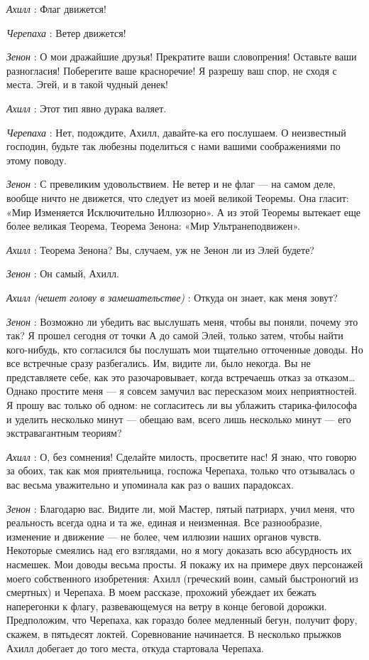 \emph{Ахилл} : Флаг движется!

\emph{Черепаха} : Ветер движется!

\emph{Зенон} : О мои дражайшие друзья! Прекратите ваши словопрения! Оставьте ваши разногласия! Поберегите ваше красноречие! Я разрешу ваш спор, не сходя с места. Эгей, и в такой чудный денек!

\emph{Ахилл} : Этот тип явно дурака валяет.

\emph{Черепаха} : Нет, подождите, Ахилл, давайте-ка его послушаем. О неизвестный господин, будьте так любезны поделиться с нами вашими соображениями по этому поводу.

\emph{Зенон} : С превеликим удовольствием. Не ветер и не флаг --- на самом деле, вообще ничто не движется, что следует из моей великой Теоремы. Она гласит: «Мир Изменяется Исключительно Иллюзорно». А из этой Теоремы вытекает еще более великая Теорема, Теорема Зенона: «Мир Ультранеподвижен».

\emph{Ахилл} : Теорема Зенона? Вы, случаем, уж не Зенон ли из Элей будете?

\emph{Зенон} : Он самый, Ахилл.

\emph{Ахилл (чешет голову в замешательстве)} : Откуда он знает, как меня зовут?

\emph{Зенон} : Возможно ли убедить вас выслушать меня, чтобы вы поняли, почему это так? Я прошел сегодня от точки А до самой Элей, только затем, чтобы найти кого-нибудь, кто согласился бы послушать мои тщательно отточенные доводы. Но все встречные сразу разбегались. Им, видите ли, было некогда. Вы не представляете себе, как это разочаровывает, когда встречаешь отказ за отказом\ldots{} Однако простите меня --- я совсем замучил вас пересказом моих неприятностей. Я прошу вас только об одном: не согласитесь ли вы ублажить старика-философа и уделить несколько минут --- обещаю вам, всего лишь несколько минут --- его экстравагантным теориям?

\emph{Ахилл} : О, без сомнения! Сделайте милость, просветите нас! Я знаю, что говорю за обоих, так как моя приятельница, госпожа Черепаха, только что отзывалась о вас весьма уважительно и упоминала как раз о ваших парадоксах.

\emph{Зенон} : Благодарю вас. Видите ли, мой Мастер, пятый патриарх, учил меня, что реальность всегда одна и та же, единая и неизменная. Все разнообразие, изменение и движение --- не более, чем иллюзии наших органов чувств. Некоторые смеялись над его взглядами, но я могу доказать всю абсурдность их насмешек. Мои доводы весьма просты. Я покажу их на примере двух персонажей моего собственного изобретения: Ахилл (греческий воин, самый быстроногий из смертных) и Черепаха. В моем рассказе, прохожий убеждает их бежать наперегонки к флагу, развевающемуся на ветру в конце беговой дорожки. Предположим, что Черепаха, как гораздо более медленный бегун, получит фору, скажем, в пятьдесят локтей. Соревнование начинается. В несколько прыжков Ахилл добегает до того места, откуда стартовала Черепаха.

